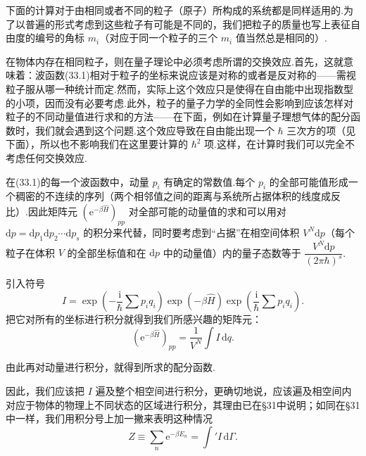 下面的计算对于由相同或者不同的粒子（原子）所构成的系统都是同样适用的.为了以普遍的形式考虑到这些粒子有可能是不同的，我们把粒子的质量也写上表征自由度的编号的角标 $m_i$（对应于同一个粒子的三个 $m_i$ 值当然总是相同的）.

在物体内存在相同粒子，则在量子理论中必须考虑所谓的交换效应.首先，这就意味着：波函数(33.1)相对于粒子的坐标来说应该是对称的或者是反对称的——需视粒子服从哪一种统计而定.然而，实际上这个效应只是使得在自由能中出现指数型的小项，因而没有必要考虑.此外，粒子的量子力学的全同性会影响到应该怎样对粒子的不同动量值进行求和的方法——在下面，例如在计算量子理想气体的配分函数时，我们就会遇到这个问题.这个效应导致在自由能出现一个 $\hbar$ 三次方的项（见下面），所以也不影响我们在这里要计算的 $\hbar^2$ 项.这样，在计算时我们可以完全不考虑任何交换效应.

在(33.1)的每一个波函数中，动量 $p_i$ 有确定的常数值.每个 $p_i$ 的全部可能值形成一个稠密的不连续的序列（两个相邻值之间的距离与系统所占据体积的线度成反比）.因此矩阵元 $\left(\mathrm{e}^{-\beta\hat{H}}\right)_{pp}$ 对全部可能的动量值的求和可以用对 $\mathrm{d}p=\mathrm{d}p_1\mathrm{d}p_2\cdots\mathrm{d}p_s$ 的积分来代替，同时要考虑到“占据”在相空间体积 $V^N\mathrm{d}p$（每个粒子在体积 $V$ 的全部坐标值和在 $\mathrm{d}p$ 中的动量值）内的量子态数等于 $\dfrac{V^N\mathrm{d}p}{(2\pi\hbar)^s}$.

引入符号
\begin{equation}
  I=\exp\left(-\frac{\mathrm{i}}{\hbar}\sum p_iq_i\right)
  \exp\left(-\beta\hat{H}\right)
  \exp\left(\frac{\mathrm{i}}{\hbar}\sum p_iq_i\right).
\end{equation}
把它对所有的坐标进行积分就得到我们所感兴趣的矩阵元：
\begin{equation}
  \left(\mathrm{e}^{-\beta\hat{H}}\right)_{pp}=\frac{1}{V^N}\int I\,\mathrm{d}q.
\end{equation}

由此再对动量进行积分，就得到所求的配分函数.

因此，我们应该把 $I$ 遍及整个相空间进行积分，更确切地说，应该遍及相空间内对应于物体的物理上不同状态的区域进行积分，其理由已在§31中说明；如同在§31中一样，我们用积分号上加一撇来表明这种情况
\begin{equation}
  Z\equiv\sum_n\mathrm{e}^{-\beta E_n}=\int'I\,\mathrm{d}\varGamma.
\end{equation}

